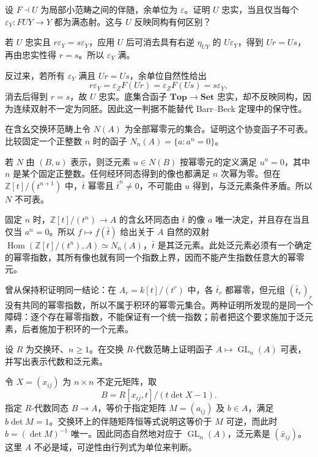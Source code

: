 \begin{exercise}\label{b4:ex:A-faithful-counit}
	设 \(F\dashv U\) 为局部小范畴之间的伴随，余单位为 \(\varepsilon\)。证明 \(U\) 忠实，当且仅当每个 \(\varepsilon_Y:FUY\to Y\) 都为满态射。这与 \(U\) 反映同构有何区别？
\end{exercise}
\begin{solution}
	若 \(U\) 忠实且 \(r\varepsilon_Y=s\varepsilon_Y\)，应用 \(U\) 后可消去具有右逆 \(\eta_{UY}\) 的 \(U\varepsilon_Y\)，得到 \(Ur=Us\)，再由忠实性得 \(r=s\)。所以 \(\varepsilon_Y\) 满。

	反过来，若所有 \(\varepsilon_Y\) 满且 \(Ur=Us\)，余单位自然性给出
	\[
		r\varepsilon_Y=\varepsilon_ZF(Ur) =\varepsilon_ZF(Us)=s\varepsilon_Y,
	\]
	消去后得到 \(r=s\)，故 \(U\) 忠实。底集合函子 \(\mathbf{Top}\to\mathbf{Set}\) 忠实，却不反映同构，因为连续双射不一定为同胚。因此这一判据不能替代 Barr–Beck 定理中的保守性。
\end{solution}

\begin{exercise}\label{b4:ex:A-nilpotent-not-representable}
	在含幺交换环范畴上令 \(N(A)\) 为全部幂零元的集合。证明这个协变函子不可表。比较固定一个正整数 \(n\) 时的函子 \(N_n(A)=\{a:a^n=0\}\)。
\end{exercise}
\begin{solution}
	若 \(N\) 由 \((B,u)\) 表示，则泛元素 \(u\in N(B)\) 按幂零元的定义满足 \(u^n=0\)，其中 \(n\) 是某个固定正整数。任何经环同态得到的像也都满足 \(n\) 次幂为零。但在 \(\mathbb Z[t]/(t^{n+1})\) 中，\(\bar t\) 幂零且 \(\bar t^n\neq0\)，不可能由 \(u\) 得到，与泛元素条件矛盾。所以 \(N\) 不可表。

	固定 \(n\) 时，\(\mathbb Z[t]/(t^n)\to A\) 的含幺环同态由 \(\bar t\) 的像 \(a\) 唯一决定，并且存在当且仅当 \(a^n=0\)。所以 \(f\mapsto f(\bar t)\) 给出关于 \(A\) 自然的双射 \(\operatorname{Hom}(\mathbb Z[t]/(t^n),A)\simeq N_n(A)\)，\(\bar t\) 是其泛元素。此处泛元素必须有一个确定的幂零指数，其所有像也就有同一个指数上界，因而不能产生指数任意大的幂零元。

	曾从保持积证明同一结论：在 \(A_r=k[t]/(t^r)\) 中，各 \(\bar t_r\) 都幂零，但元组 \((\bar t_r)_r\) 没有共同的幂零指数，所以不属于积环的幂零元集合。两种证明所发现的是同一个障碍：逐个存在幂零指数，不能保证有一个统一指数；前者把这个要求施加于泛元素，后者施加于积环的一个元素。
\end{solution}

\begin{exercise}\label{b4:ex:A-general-linear-representability}
	设 \(R\) 为交换环、\(n\ge1\)。在交换 \(R\)-代数范畴上证明函子 \(A\mapsto\operatorname{GL}_n(A)\) 可表，并写出表示代数和泛元素。
\end{exercise}
\begin{solution}
	令 \(X=(x_{ij})\) 为 \(n\times n\) 不定元矩阵，取
	\[
		B=R[x_{ij},t]/\left(t\det X-1\right).
	\]
	指定 \(R\)-代数同态 \(B\to A\)，等价于指定矩阵 \(M=(a_{ij})\) 及 \(b\in A\)，满足 \(b\det M=1\)。交换环上的伴随矩阵恒等式说明这等价于 \(M\) 可逆，而此时 \(b=(\det M)^{-1}\) 唯一。因此同态自然地对应于 \(\operatorname{GL}_n(A)\)，泛元素是 \((\bar x_{ij})\)。这里 \(A\) 不必是域，可逆性由行列式为单位来判断。
\end{solution}


